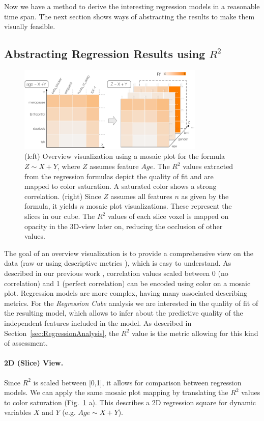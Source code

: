 \documentclass[journal]{style/vgtc} 			          %
\begin{document}
Now we have a method to derive the interesting regression models in a reasonable time span.
The next section shows ways of abstracting the results to make them visually feasible.

\subsection{Abstracting Regression Results using $R^2$}
\begin{figure}[htb]
 \centering
 \includegraphics[width=3.5in]{figures/cube}
 \caption{
 (left) Overview visualization using a mosaic plot for the formula $Z \sim X + Y$, where $Z$ assumes feature $Age$.
 The $R^2$ values extracted from the regression formulas depict the quality of fit and are mapped to color saturation.
 A saturated color shows a strong correlation.
 (right) Since $Z$ assumes all features $n$ as given by the formula, it yields $n$ mosaic plot visualizations.
 These represent the slices in our cube.
 The $R^2$ values of each slice voxel is mapped on opacity in the 3D-view later on, reducing the occlusion of other values.
 }
  \label{fig:Cube}
\end{figure}
The goal of an overview visualization is to provide a comprehensive view on the data (raw or using descriptive metrics \cite{Bertini}), which is easy to understand.
As described in our previous work \cite{Klemm2014VIS}, correlation values scaled between 0 (no correlation) and 1 (perfect correlation) can be encoded using color on a mosaic plot.
Regression models are more complex, having many associated describing metrics.
For the \emph{Regression Cube} analysis we are interested in the quality of fit of the resulting model, which allows to infer about the predictive quality of the independent features included in the model.
As described in Section~\ref{sec:RegressionAnalysis}, the $R^2$ value is the metric allowing for this kind of assessment.
\paragraph{2D (Slice) View.}
Since $R^2$ is scaled between [0,1], it allows for comparison between regression models.
We can apply the same mosaic plot mapping by translating the $R^2$ values to color saturation (Fig.~\ref{fig:Cube} a).
This describes a 2D regression square for dynamic variables $X$ and $Y$ (e.g. $Age \sim X + Y$).
\end{document}
